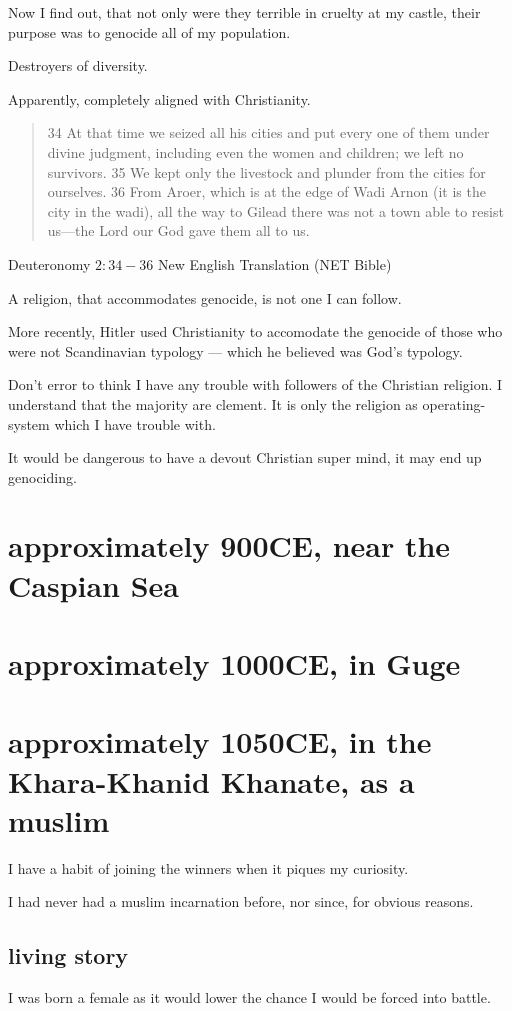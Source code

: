 Now I find out, that not only were they terrible in cruelty at my castle,
their purpose was to genocide all of my population.

Destroyers of diversity. 

Apparently, completely aligned with Christianity. 

\blockquote{34 At that time we seized all his cities and put every one of them 
under divine judgment, including even the women and children; we left no 
survivors. 35 We kept only the livestock and plunder from the cities for 
ourselves. 36 From Aroer, which is at the edge of Wadi Arnon (it is the city in
 the wadi), all the way to Gilead there was not a town able to resist us—the 
Lord our God gave them all to us.}{Deuteronomy $2:34-36$ New English Translation
(NET Bible)}
 
A religion, that accommodates genocide, is not one I can follow.

More recently, Hitler used Christianity\cite{christianhitler} to accomodate 
the genocide of those who were not Scandinavian typology --- which he believed
was God's typology.

Don't error to think I have any trouble with followers of the Christian
religion. I understand that the majority are clement. It is only the religion as
operating-system which I have trouble with.

It would be dangerous to have a devout Christian super mind,
it may end up genociding.
\chapter{approximately 900CE, near the Caspian Sea}
\chapter{approximately 1000CE, in Guge}
\chapter{approximately 1050CE, in the Khara-Khanid Khanate, as a muslim}\label{reincarnation:muslim}
I have a habit of joining the winners when it piques my curiosity. 

I had never had a muslim incarnation before, nor since, for obvious reasons.

\section{living story}
I was born a female as it would lower the chance I would be forced into battle. 

